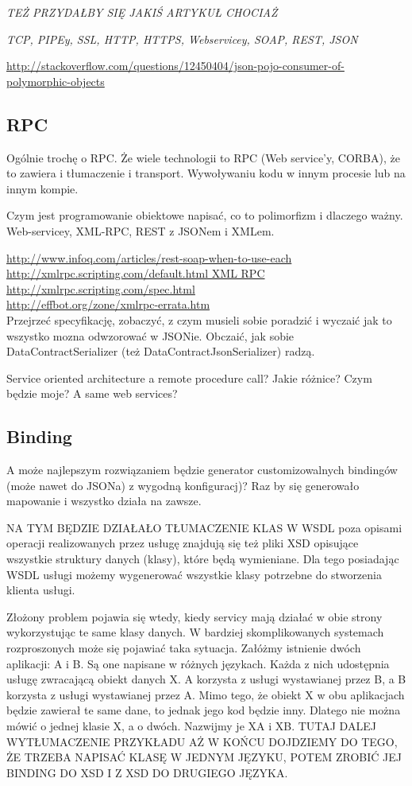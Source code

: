 \emph{TEŻ PRZYDAŁBY SIĘ JAKIŚ ARTYKUŁ CHOCIAŻ}

\emph{TCP, PIPEy, SSL, HTTP, HTTPS, Webservicey, SOAP, REST, JSON}

\url{http://stackoverflow.com/questions/12450404/json-pojo-consumer-of-polymorphic-objects}

\subsection{RPC}
Ogólnie trochę o RPC. Że wiele technologii to RPC (Web service'y, CORBA), że to zawiera i tłumaczenie i transport.
Wywoływaniu kodu w innym procesie lub na innym kompie.

Czym jest programowanie obiektowe napisać, co to polimorfizm i dlaczego ważny. Web-servicey, XML-RPC, REST z JSONem i XMLem.

\url{http://www.infoq.com/articles/rest-soap-when-to-use-each}\\

\url{http://xmlrpc.scripting.com/default.html XML RPC}\\
\url{http://xmlrpc.scripting.com/spec.html}\\
\url{http://effbot.org/zone/xmlrpc-errata.htm}\\
Przejrzeć specyfikację, zobaczyć, z czym musieli sobie poradzić i wyczaić jak to wszystko mozna odwzorować w JSONie. Obczaić, jak sobie DataContractSerializer (też DataContractJsonSerializer) radzą. 

Service oriented architecture a remote procedure call? Jakie różnice? Czym będzie moje? A same web services?

\subsection{Binding}
A może najlepszym rozwiązaniem będzie generator customizowalnych bindingów (może nawet do JSONa) z wygodną konfiguracj)? Raz by się generowało mapowanie i wszystko działa na zawsze. 

NA TYM BĘDZIE DZIAŁAŁO TŁUMACZENIE KLAS
W WSDL poza opisami operacji realizowanych przez usługę znajdują się też pliki XSD opisujące wszystkie struktury danych (klasy), które będą wymieniane. Dla tego posiadając WSDL usługi możemy wygenerować wszystkie klasy potrzebne do stworzenia klienta usługi.

Złożony problem pojawia się wtedy, kiedy servicy mają działać w obie strony wykorzystując te same klasy danych. W bardziej skomplikowanych systemach rozproszonych może się pojawiać taka sytuacja. Załóżmy istnienie dwóch aplikacji: A i B. Są one napisane w różnych językach. Każda z nich udostępnia usługę zwracającą obiekt danych X. A korzysta z usługi wystawianej przez B, a B korzysta z usługi wystawianej przez A. Mimo tego, że obiekt X w obu aplikacjach będzie zawierał te same dane, to jednak jego kod będzie inny. Dlatego nie można mówić o jednej klasie X, a o dwóch. Nazwijmy je XA i XB. TUTAJ DALEJ WYTŁUMACZENIE PRZYKŁADU AŻ W KOŃCU DOJDZIEMY DO TEGO, ŻE TRZEBA NAPISAĆ KLASĘ W JEDNYM JĘZYKU, POTEM ZROBIĆ JEJ BINDING DO XSD I Z XSD DO DRUGIEGO JĘZYKA.

